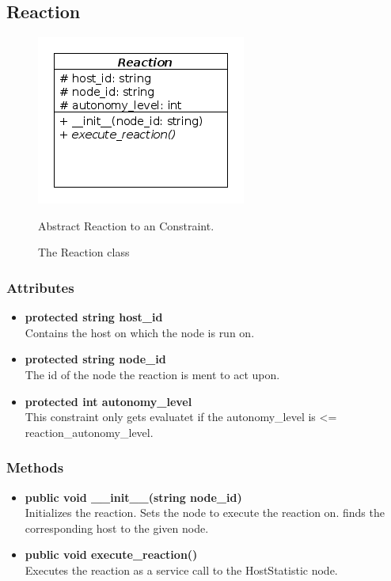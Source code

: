 \subsection{Reaction}
\begin{figure}[htbp]
	\begin{minipage}[t]{8cm}
		\vspace{0pt}
		\centering
		\includegraphics[scale=0.6]{./diagram_pictures/reactor/Reaction.png}
		\caption{The Reaction class}
	\end{minipage}
	\hfill
	\begin{minipage}[t]{8cm}
		\vspace{10pt}
			Abstract Reaction to an Constraint.
	\end{minipage}
\end{figure}  

\subsubsection{Attributes}
\begin{itemize}
	\item \textbf{ protected string host\_id }\\
		Contains the host on which the node is run on.
	\item \textbf{ protected string node\_id }\\
		The id of the node the reaction is ment to act upon.
	\item \textbf{ protected int autonomy\_level }\\
		This constraint only gets evaluatet if 
		the autonomy\_level is <= reaction\_autonomy\_level.
\end{itemize}
\subsubsection{Methods}
\begin{itemize}
	\item \textbf{ public void \_\_init\_\_(string node\_id) }\\
		Initializes the reaction. Sets the node to execute the reaction on. finds the corresponding host to the given node.
	\item \textbf{ public void execute\_reaction() }\\
		Executes the reaction as a service call to the HostStatistic node.
\end{itemize}

